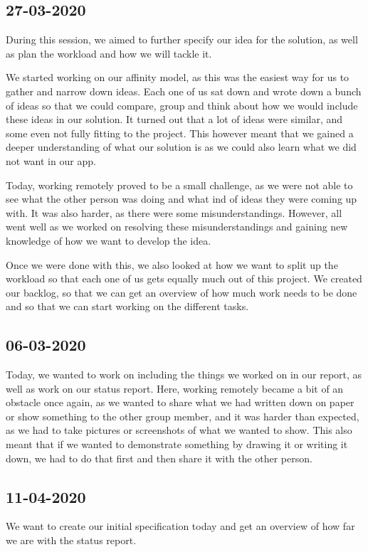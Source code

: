 \documentclass{article}
\begin{document}
\subsection*{27-03-2020}
During this session, we aimed to further specify our idea for the solution, as well as plan the workload and how we will tackle it.

We started working on our affinity model, as this was the easiest way for us to gather and narrow down ideas. Each one of us sat down and wrote down a bunch of ideas so that we could compare, group and think about how we would include these ideas in our solution. It turned out that a lot of ideas were similar, and some even not fully fitting to the project. This however meant that we gained a deeper understanding of what our solution is as we could also learn what we did not want in our app.

Today, working remotely proved to be a small challenge, as we were not able to see what the other person was doing and what ind of ideas they were coming up with. It was also harder, as there were some misunderstandings. However, all went well as we worked on resolving these misunderstandings and gaining new knowledge of how we want to develop the idea.

Once we were done with this, we also looked at how we want to split up the workload so that each one of us gets equally much out of this project. We created our backlog, so that we can get an overview of how much work needs to be done and so that we can start working on the different tasks.

\subsection*{06-03-2020}
Today, we wanted to work on including the things we worked on in our report, as well as work on our status report. Here, working remotely became a bit of an obstacle once again, as we wanted to share what we had written down on paper or show something to the other group member, and it was harder than expected, as we had to take pictures or screenshots of what we wanted to show. This also meant that if we wanted to demonstrate something by drawing it or writing it down, we had to do that first and then share it with the other person.

\subsection*{11-04-2020}
We want to create our initial specification today and get an overview of how far we are with the status report.
\end{document}
